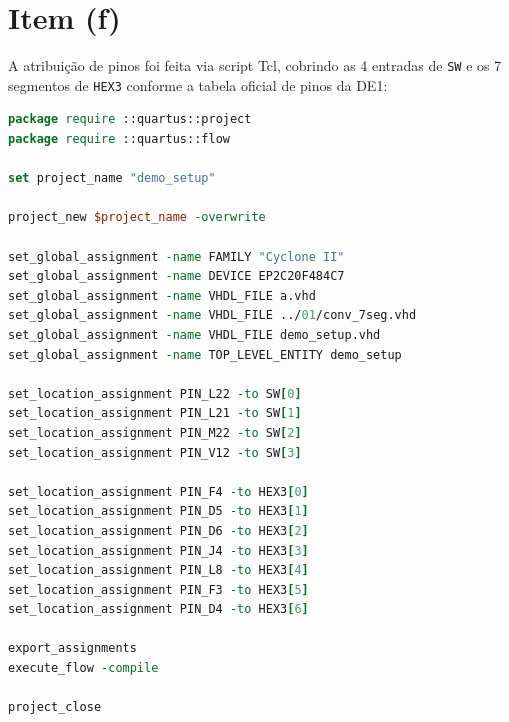 \documentclass[report, 12pt]{uftreport}
\begin{document}
\section{Item (f)}

A atribuição de pinos foi feita via script Tcl, cobrindo as 4 entradas de \texttt{SW} e os 7 segmentos de \texttt{HEX3} conforme a tabela oficial de pinos da DE1:

\begin{lstlisting}[language=tcl]
package require ::quartus::project
package require ::quartus::flow

set project_name "demo_setup"

project_new $project_name -overwrite

set_global_assignment -name FAMILY "Cyclone II"
set_global_assignment -name DEVICE EP2C20F484C7
set_global_assignment -name VHDL_FILE a.vhd
set_global_assignment -name VHDL_FILE ../01/conv_7seg.vhd
set_global_assignment -name VHDL_FILE demo_setup.vhd
set_global_assignment -name TOP_LEVEL_ENTITY demo_setup

set_location_assignment PIN_L22 -to SW[0]
set_location_assignment PIN_L21 -to SW[1]
set_location_assignment PIN_M22 -to SW[2]
set_location_assignment PIN_V12 -to SW[3]

set_location_assignment PIN_F4 -to HEX3[0]
set_location_assignment PIN_D5 -to HEX3[1]
set_location_assignment PIN_D6 -to HEX3[2]
set_location_assignment PIN_J4 -to HEX3[3]
set_location_assignment PIN_L8 -to HEX3[4]
set_location_assignment PIN_F3 -to HEX3[5]
set_location_assignment PIN_D4 -to HEX3[6]

export_assignments
execute_flow -compile

project_close
\end{lstlisting}
\end{document}
